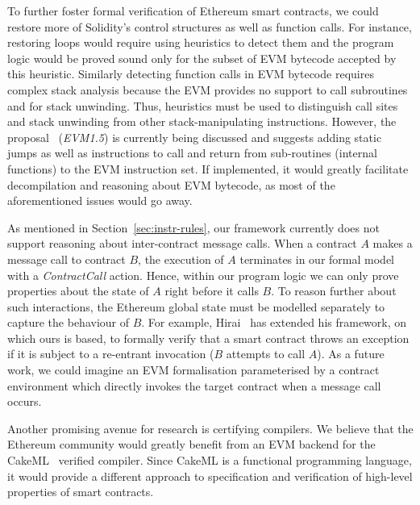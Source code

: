 \documentclass[sigplan,10pt]{acmart}\settopmatter{printfolios=true,printccs=false,printacmref=false}
\begin{document}
To further foster formal verification of Ethereum smart contracts, we
could restore more of Solidity's control structures as well as function calls.
For instance, restoring loops would require using heuristics
to detect them and the program logic would be proved sound only
for the subset of EVM bytecode accepted by this heuristic.
Similarly detecting function calls in EVM bytecode requires
complex stack analysis because the EVM provides no support to call
subroutines and for stack unwinding.
Thus, heuristics must be used to distinguish call sites and
stack unwinding from other stack-manipulating instructions.
However, the proposal~\cite{subroutines} (\emph{EVM1.5}) is currently being discussed and 
suggests adding static jumps as well as instructions to call and
return from sub-routines (internal functions) to the EVM instruction set.
If implemented, it would greatly facilitate
decompilation and reasoning about EVM bytecode, as most of the aforementioned
issues would go away.

As mentioned in Section~\ref{sec:instr-rules}, our framework currently does not support reasoning about inter-contract message calls.
When a contract $A$ makes a message call to contract $B$,
the execution of $A$ terminates in our formal model with a \textit{ContractCall} action.
Hence, within our program logic we can only prove properties
about the state of $A$ right before it calls $B$.
To reason further about such interactions, the Ethereum global state %
must be modelled separately to capture the behaviour of $B$.
For example, Hirai~\cite{Yoichi} has extended his framework,
on which ours is based, to formally verify that a smart contract
throws an exception if it is subject to a re-entrant invocation
($B$ attempts to call $A$).
As a future work, we could imagine an EVM formalisation parameterised by
a contract environment which directly invokes the target contract
when a message call occurs.

Another promising avenue for research is certifying compilers.
We believe that the Ethereum community
would greatly benefit from an EVM backend for the CakeML~\cite{Owens_NKMT_17}
verified compiler.
Since CakeML is a functional programming language, it would
provide a different approach to specification and verification of high-level properties
of smart contracts.


\end{document}
